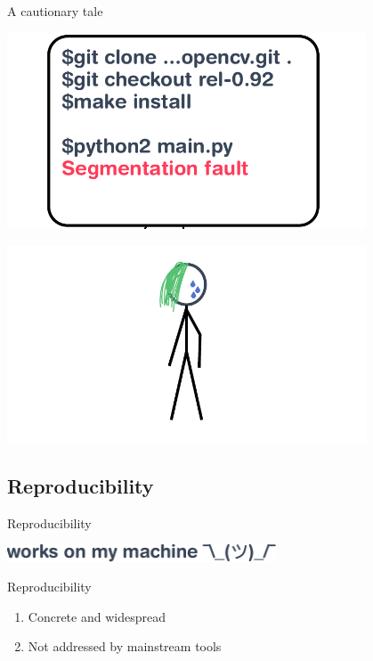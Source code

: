 \documentclass[aspectratio=169]{beamer}
\begin{document}
\begin{frame}{A cautionary tale}
{    }
     {
        \huge {}
        \begin{center}
        \includegraphics[width=0.8\textwidth]{img/princess-comics-try-7.pdf}
        \end{center}
    }
     {
        \begin{center}
        \huge {}
        \end{center}
        \begin{center}
        \includegraphics[width=0.8\textwidth]{img/princess-comics-outro.pdf}
        \end{center}
    }
\end{frame}

\subsection{Reproducibility}

\begin{frame}{Reproducibility}
    \begin{center}
        \includegraphics[width=0.6\textwidth]{img/works-on-my-machine.pdf}
    \end{center}

    \vspace{20pt}

     {
    \begin{alertblock}{Reproducibility}
    \begin{enumerate}
        \item<3-> Concrete and widespread
        \item<4-> Not addressed by mainstream tools
    \end{enumerate}
    \end{alertblock}
}
\end{frame}
\end{document}

